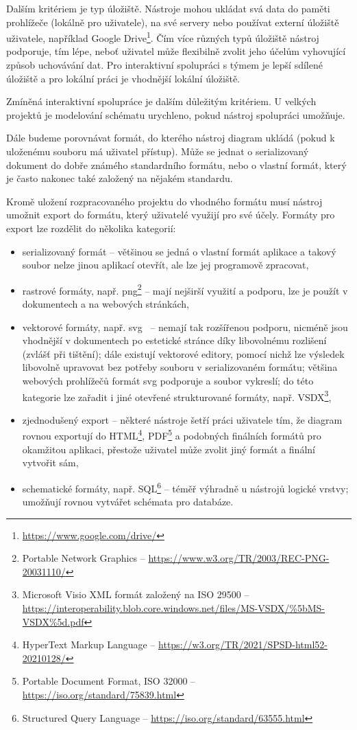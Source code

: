 Dalším kritériem je typ úložiště.
Nástroje mohou ukládat svá data do paměti prohlížeče (lokálně pro uživatele), na své servery nebo používat externí úložiště uživatele, například Google Drive\footnote{\url{https://www.google.com/drive/}}.
Čím více různých typů úložiště nástroj podporuje, tím lépe, neboť uživatel může flexibilně zvolit jeho účelům vyhovující způsob uchovávání dat.
Pro interaktivní spolupráci s týmem je lepší sdílené úložiště a pro lokální práci je vhodnější lokální úložiště.

Zmíněná interaktivní spolupráce je dalším důležitým kritériem.
U velkých projektů je modelování schématu urychleno, pokud nástroj spolupráci umožňuje.

Dále budeme porovnávat formát, do kterého nástroj diagram ukládá (pokud k uloženému souboru má uživatel přístup).
Může se jednat o serializovaný dokument do dobře známého standardního formátu, nebo o vlastní formát, který je často nakonec také založený na nějakém standardu.

Kromě uložení rozpracovaného projektu do vhodného formátu musí nástroj umožnit export do formátu, který uživatelé využijí pro své účely.
Formáty pro export lze rozdělit do několika kategorií:
\begin{itemize}
  \item serializovaný formát -- většinou se jedná o vlastní formát aplikace a takový soubor nelze jinou aplikací otevřít, ale lze jej programově zpracovat,
  \item rastrové formáty, např. \acrfull{png}\footnote{Portable Network Graphics -- \url{https://www.w3.org/TR/2003/REC-PNG-20031110/}} -- mají nejširší využití a podporu, lze je použít v dokumentech a na webových stránkách,
  \item vektorové formáty, např. \acrfull{svg}~\cite{brinza_svg_2018} -- nemají tak rozšířenou podporu, nicméně jsou vhodnější v dokumentech po estetické stránce díky libovolnému rozlišení (zvlášť při tištění);
        dále existují vektorové editory, pomocí nichž lze výsledek libovolně upravovat bez potřeby souboru v serializovaném formátu;
        většina webových prohlížečů formát \acrshort{svg} podporuje a soubor vykreslí;
        do této kategorie lze zařadit i jiné otevřené strukturované formáty, např. VSDX\footnote{Microsoft Visio XML formát založený na ISO 29500 -- \url{https://interoperability.blob.core.windows.net/files/MS-VSDX/\%5bMS-VSDX\%5d.pdf}},
  \item zjednodušený export -- některé nástroje šetří práci uživatele tím, že diagram rovnou exportují do HTML\footnote{HyperText Markup Language -- \url{https://w3.org/TR/2021/SPSD-html52-20210128/}}, PDF\footnote{Portable Document Format, ISO 32000 -- \url{https://iso.org/standard/75839.html}} a podobných finálních formátů pro okamžitou aplikaci, přestože uživatel může zvolit jiný formát a finální vytvořit sám,
  \item schematické formáty, např. SQL\footnote{Structured Query Language -- \url{https://iso.org/standard/63555.html}} -- téměř výhradně u nástrojů lo\-gic\-ké vrst\-vy; umožňují rovnou vytvářet schémata pro databáze.
\end{itemize}

